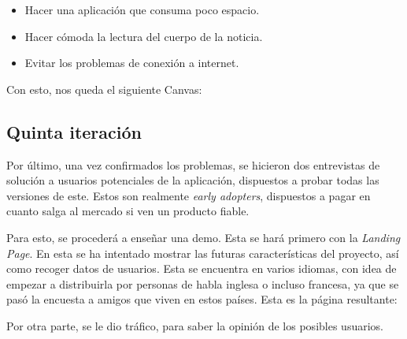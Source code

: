 \begin{itemize}
    \item Hacer una aplicación que consuma poco espacio.
    \item Hacer cómoda la lectura del cuerpo de la noticia.
    \item Evitar los problemas de conexión a internet.
\end{itemize}

Con esto, nos queda el siguiente Canvas:


\subsection{Quinta iteración}
Por último, una vez confirmados los problemas, se hicieron dos entrevistas de solución a usuarios potenciales de la aplicación, dispuestos a probar todas las versiones de este. Estos son realmente \textit{early adopters}, dispuestos a pagar en cuanto salga al mercado si ven un producto fiable.

Para esto, se procederá a enseñar una demo. Esta se hará primero con la \textit{Landing Page}. En esta se ha intentado mostrar las futuras características del proyecto, así como recoger datos de usuarios. Esta se encuentra en varios idiomas, con idea de empezar a distribuirla por personas de habla inglesa o incluso francesa, ya que se pasó la encuesta a amigos que viven en estos países.
Esta es la página resultante:


Por otra parte, se le dio tráfico, para saber la opinión de los posibles usuarios.


